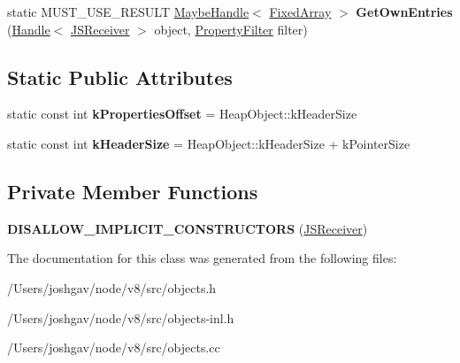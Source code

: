 \begin{DoxyCompactItemize}
\item 
static M\+U\+S\+T\+\_\+\+U\+S\+E\+\_\+\+R\+E\+S\+U\+LT \hyperlink{classv8_1_1internal_1_1_maybe_handle}{Maybe\+Handle}$<$ \hyperlink{classv8_1_1internal_1_1_fixed_array}{Fixed\+Array} $>$ {\bfseries Get\+Own\+Entries} (\hyperlink{classv8_1_1internal_1_1_handle}{Handle}$<$ \hyperlink{classv8_1_1internal_1_1_j_s_receiver}{J\+S\+Receiver} $>$ object, \hyperlink{namespacev8_afbf02b6b1152a3e25d7bde90798209ac}{Property\+Filter} filter)\hypertarget{classv8_1_1internal_1_1_j_s_receiver_a46e1629664ebac6a9a2f82a0f5278cb5}{}\label{classv8_1_1internal_1_1_j_s_receiver_a46e1629664ebac6a9a2f82a0f5278cb5}

\end{DoxyCompactItemize}
\subsection*{Static Public Attributes}
\begin{DoxyCompactItemize}
\item 
static const int {\bfseries k\+Properties\+Offset} = Heap\+Object\+::k\+Header\+Size\hypertarget{classv8_1_1internal_1_1_j_s_receiver_a5381d34d429e304e4fac46b140b73e52}{}\label{classv8_1_1internal_1_1_j_s_receiver_a5381d34d429e304e4fac46b140b73e52}

\item 
static const int {\bfseries k\+Header\+Size} = Heap\+Object\+::k\+Header\+Size + k\+Pointer\+Size\hypertarget{classv8_1_1internal_1_1_j_s_receiver_a501c56748749cf15fdb0fd07a5c0d20b}{}\label{classv8_1_1internal_1_1_j_s_receiver_a501c56748749cf15fdb0fd07a5c0d20b}

\end{DoxyCompactItemize}
\subsection*{Private Member Functions}
\begin{DoxyCompactItemize}
\item 
{\bfseries D\+I\+S\+A\+L\+L\+O\+W\+\_\+\+I\+M\+P\+L\+I\+C\+I\+T\+\_\+\+C\+O\+N\+S\+T\+R\+U\+C\+T\+O\+RS} (\hyperlink{classv8_1_1internal_1_1_j_s_receiver}{J\+S\+Receiver})\hypertarget{classv8_1_1internal_1_1_j_s_receiver_a37951ff9ee1c0d33533943cb30864586}{}\label{classv8_1_1internal_1_1_j_s_receiver_a37951ff9ee1c0d33533943cb30864586}

\end{DoxyCompactItemize}


The documentation for this class was generated from the following files\+:\begin{DoxyCompactItemize}
\item 
/\+Users/joshgav/node/v8/src/objects.\+h\item 
/\+Users/joshgav/node/v8/src/objects-\/inl.\+h\item 
/\+Users/joshgav/node/v8/src/objects.\+cc\end{DoxyCompactItemize}
